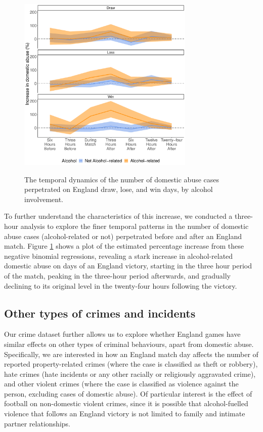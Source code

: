 \documentclass[12pt, a4paper]{article}
\begin{document}
 \begin{figure}[!htbp]
\centering
 \caption{The temporal dynamics of the number of domestic abuse cases perpetrated on England draw, lose, and win days, by alcohol involvement.}
\includegraphics[width=0.75\textwidth]{Threehours_newdata.pdf}
\label{fig:threehours}
\end{figure}

 To further understand the characteristics of this increase, we conducted a three-hour analysis to explore the finer temporal patterns in the number of domestic abuse cases (alcohol-related or not) perpetrated before and after an England match. Figure \ref{fig:threehours} shows a plot of the estimated percentage increase from these negative binomial regressions, revealing a stark increase in alcohol-related domestic abuse on days of an England victory, starting in the three hour period of the match, peaking in the three-hour period afterwards, and gradually declining to its original level in the twenty-four hours following the victory. 

\subsection{Other types of crimes and incidents}

Our crime dataset further allows us to explore whether England games have similar effects on other types of criminal behaviours, apart from domestic abuse. Specifically, we are interested in how an England match day affects the number of reported property-related crimes (where the case is classified as theft or robbery), hate crimes (hate incidents or any other racially or religiously aggravated crime), and other violent crimes (where the case is classified as violence against the person, excluding cases of domestic abuse). Of particular interest is the effect of football on non-domestic violent crimes, since it is possible that alcohol-fuelled violence that follows an England victory is not limited to family and intimate partner relationships. 
\end{document}
